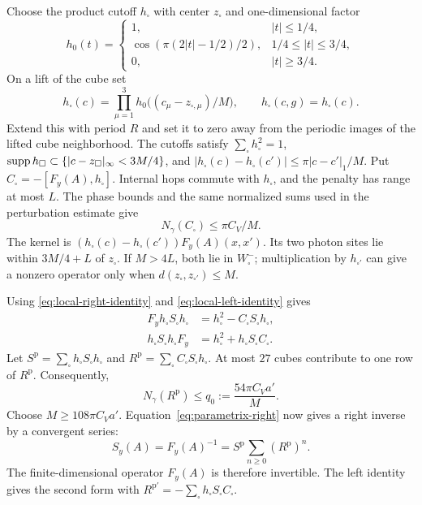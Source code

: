Choose the product cutoff $h_\square$ with center $z_\square$ and
one-dimensional factor
\[
 h_0(t)=\begin{cases}
 1,&|t|\le1/4,\\
 \cos(\pi(2|t|-1/2)/2),&1/4\le|t|\le3/4,\\
 0,&|t|\ge3/4.
 \end{cases}
\]
On a lift of the cube set
\[
 h_\square(c)=\prod_{\mu=1}^3
 h_0\bigl((c_\mu-z_{\square,\mu})/M\bigr),\qquad
 h_\square(c,g)=h_\square(c).
\]
Extend this with period $R$ and set it to zero away from the periodic
images of the lifted cube neighborhood.
The cutoffs satisfy $\sum_\square h_\square^2=1$,
$\operatorname{supp} h_\square\subset\{|c-z_\square|_\infty<3M/4\}$, and
$|h_\square(c)-h_\square(c')|\le\pi|c-c'|_1/M$.
Put $C_\square=-[F_y(A),h_\square]$. Internal hops commute with
$h_\square$, and the penalty has range at most $L$. The phase bounds
and the same normalized sums used in the perturbation estimate give
\begin{equation}\label{eq:cutoff-commutator-bound}
 N_\gamma(C_\square)\le\pi C_V/M.
\end{equation}
The kernel is
$(h_\square(c)-h_\square(c'))F_y(A)(x,x')$. Its two photon sites lie
within $3M/4+L$ of $z_\square$. If $M>4L$, both lie in
$W_\square^-$; multiplication by $h_{\square'}$ can give a nonzero
operator only when $d(z_\square,z_{\square'})\le M$.

Using \eqref{eq:local-right-identity} and
\eqref{eq:local-left-identity} gives
\begin{align}
 F_yh_\square S_\square h_\square
       &=h_\square^2-C_\square S_\square h_\square,
                                   \label{eq:parametrix-right}\\
 h_\square S_\square h_\square F_y
       &=h_\square^2+h_\square S_\square C_\square.
                                   \label{eq:parametrix-left}
\end{align}
Let $S^{\mathrm p}=\sum_\square h_\square S_\square h_\square$ and
$R^{\mathrm p}=\sum_\square C_\square S_\square h_\square$.
At most $27$ cubes contribute to one row of $R^{\mathrm p}$.
Consequently,
\[
 N_\gamma(R^{\mathrm p})\le q_0:=\frac{54\pi C_Va'}M.
\]
Choose $M\ge108\pi C_Va'$. Equation~\eqref{eq:parametrix-right}
now gives a right inverse by a convergent series:
\begin{equation}\label{eq:global-parametrix-inverse}
 S_y(A)=F_y(A)^{-1}=S^{\mathrm p}\sum_{n\ge0}(R^{\mathrm p})^n.
\end{equation}
The finite-dimensional operator $F_y(A)$ is therefore invertible.
The left identity gives the second form with
$R^{\mathrm p\prime}=-\sum_\square h_\square S_\square C_\square$.


